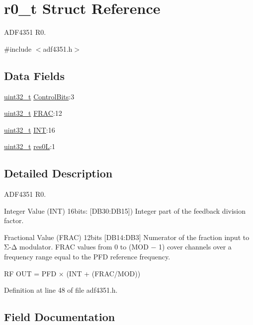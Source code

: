 \hypertarget{structr0__t}{}\section{r0\+\_\+t Struct Reference}
\label{structr0__t}


A\+D\+F4351 R0.  




{\ttfamily \#include $<$adf4351.\+h$>$}

\subsection*{Data Fields}
\begin{DoxyCompactItemize}
\item 
\hyperlink{send_8c_a435d1572bf3f880d55459d9805097f62}{uint32\+\_\+t} \hyperlink{structr0__t_aad2911768ed7dd38e899b81d517dda08}{Control\+Bits}\+:3
\item 
\hyperlink{send_8c_a435d1572bf3f880d55459d9805097f62}{uint32\+\_\+t} \hyperlink{structr0__t_adc22c0b86ef296065f01c8800d4f5d52}{F\+R\+AC}\+:12
\item 
\hyperlink{send_8c_a435d1572bf3f880d55459d9805097f62}{uint32\+\_\+t} \hyperlink{structr0__t_a1d7f06769cdf259c9858033cb164e31d}{I\+NT}\+:16
\item 
\hyperlink{send_8c_a435d1572bf3f880d55459d9805097f62}{uint32\+\_\+t} \hyperlink{structr0__t_ab7402e75c2a633ce378078407151341d}{res0L}\+:1
\end{DoxyCompactItemize}


\subsection{Detailed Description}
A\+D\+F4351 R0. 

Integer Value (I\+NT) 16bits\+: \mbox{[}D\+B30\+:D\+B15\mbox{]}) Integer part of the feedback division factor.

Fractional Value (F\+R\+AC) 12bits \mbox{[}D\+B14\+:D\+B3\mbox{]} Numerator of the fraction input to Σ-\/Δ modulator. F\+R\+AC values from 0 to (M\+OD − 1) cover channels over a frequency range equal to the P\+FD reference frequency.

RF O\+UT = P\+FD × (I\+NT + (F\+R\+A\+C/\+M\+OD)) 

Definition at line 48 of file adf4351.\+h.



\subsection{Field Documentation}
